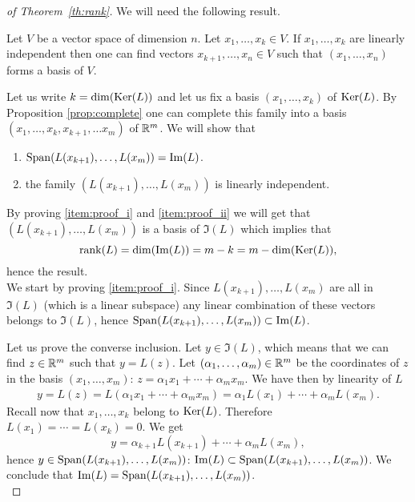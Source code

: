 \documentclass[11pt,nocut]{article}
\begin{document}
\begin{proof}[of Theorem~\ref{th:rank}]
	We will need the following result.
\begin{proposition}\label{prop:complete}
	Let $V$ be a vector space of dimension $n$.
	Let $x_1, \dots, x_k \in V$. 
	If $x_1, \dots, x_k$  are linearly independent then one can find vectors $x_{k+1}, \dots, x_{n} \in V$ such that $(x_1, \dots, x_n)$ forms a basis of $V$.
\end{proposition}

	Let us write $k = {{\rm dim}}({{\rm Ker}}(L))$ and let us fix a basis $(x_1, \dots, x_k)$ of ${{\rm Ker}}(L)$. By Proposition \ref{prop:complete} one can complete this family into a basis $(x_1, \dots, x_k, x_{k+1}, \dots x_m)$ of $\mathbb{R}^m$.
	We will show that
	\begin{enumerate}[label=(\roman*)]
		\item \label{item:proof_i} ${{\rm Span}}(L(x_{k+1}), \dots, L(x_m)) = {{\rm Im}}(L)$.
		\item \label{item:proof_ii} the family $(L(x_{k+1}), \dots, L(x_{m}))$ is linearly independent.
	\end{enumerate}

	By proving \ref{item:proof_i} and \ref{item:proof_ii} we will get that $(L(x_{k+1}), \dots, L(x_{m}))$ is a basis of $\Im(L)$ which implies that 
	$$
	{{\rm rank}}(L) = {{\rm dim}}({{\rm Im}}(L)) = m - k = m - {{\rm dim}}({{\rm Ker}}(L)),
	$$
	hence the result.
\\

We start by proving \ref{item:proof_i}. Since $L(x_{k+1}), \dots, L(x_m)$ are all in $\Im(L)$ (which is a linear subspace) any linear combination of these vectors belongs to $\Im(L)$, hence ${{\rm Span}}(L(x_{k+1}), \dots, L(x_m)) \subset {{\rm Im}}(L)$.

Let us prove the converse inclusion.
Let $y \in \Im(L)$, which means that we can find $z \in \mathbb{R}^m$ such that $y = L(z)$. Let $(\alpha_1, \dots, \alpha_m) \in \mathbb{R}^m$ be the coordinates of $z$ in the basis $(x_1, \dots, x_m)$: $z = \alpha_1 x_1 + \cdots + \alpha_m x_m$. We have then by linearity of $L$
\begin{align*}
y = L(z) = L(\alpha_1 x_1 + \cdots + \alpha_m x_m)
= \alpha_1 L(x_1) + \cdots + \alpha_m L(x_m).
\end{align*}
Recall now that $x_1, \dots, x_k$ belong to ${{\rm Ker}}(L)$. Therefore $L(x_1) = \cdots = L(x_k) = 0$. We get
$$
y = \alpha_{k+1} L(x_{k+1}) + \cdots + \alpha_{m} L(x_{m}),
$$
hence $y \in {{\rm Span}}(L(x_{k+1}), \dots, L(x_m))$: ${{\rm Im}}(L) \subset {{\rm Span}}(L(x_{k+1}), \dots, L(x_m))$. We conclude that ${{\rm Im}}(L) = {{\rm Span}}(L(x_{k+1}), \dots, L(x_m))$.
\\


\end{proof}
\end{document}
